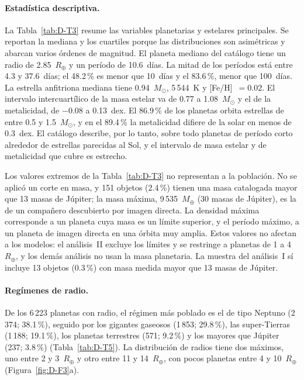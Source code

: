 \paragraph{Estadística descriptiva.}
La Tabla~\ref{tab:D-T3} resume las variables planetarias y estelares principales. Se
reportan la mediana y los cuartiles porque las distribuciones son asimétricas y abarcan
varios órdenes de magnitud. El planeta mediano del catálogo tiene un radio de
2.85~$R_\oplus$ y un período de 10.6~días. La mitad de los períodos está entre 4.3 y
37.6~días; el 48.2\,\% es menor que 10~días y el 83.6\,\%, menor que 100~días. La estrella
anfitriona mediana tiene 0.94~$M_\odot$, 5\,544~K y [Fe/H]~$= 0.02$. El intervalo
intercuartílico de la masa estelar va de 0.77 a 1.08~$M_\odot$ y el de la metalicidad, de
$-0.08$ a 0.13~dex. El 86.9\,\% de los planetas orbita estrellas de entre 0.5 y
1.5~$M_\odot$, y en el 89.4\,\% la metalicidad difiere de la solar en menos de 0.3~dex. El
catálogo describe, por lo tanto, sobre todo planetas de período corto alrededor de
estrellas parecidas al Sol, y el intervalo de masa estelar y de metalicidad que cubre es
estrecho.



Los valores extremos de la Tabla~\ref{tab:D-T3} no representan a la población. No se aplicó
un corte en masa, y 151 objetos (2.4\,\%) tienen una masa catalogada mayor que 13 masas de
Júpiter; la masa máxima, 9\,535~$M_\oplus$ (30 masas de Júpiter), es la de un compañero
descubierto por imagen directa. La densidad máxima corresponde a un planeta cuya masa es un
límite superior, y el período máximo, a un planeta de imagen directa en una órbita muy
amplia. Estos valores no afectan a los modelos: el análisis~II excluye los límites y se
restringe a planetas de 1 a 4~$R_\oplus$, y los demás análisis no usan la masa planetaria.
La muestra del análisis~I sí incluye 13 objetos (0.3\,\%) con masa medida mayor que 13
masas de Júpiter.

\paragraph{Regímenes de radio.}
De los 6\,223 planetas con radio, el régimen más poblado es el de tipo Neptuno (2\,374;
38.1\,\%), seguido por los gigantes gaseosos (1\,853; 29.8\,\%), las super-Tierras (1\,188;
19.1\,\%), los planetas terrestres (571; 9.2\,\%) y los mayores que Júpiter (237; 3.8\,\%)
(Tabla~\ref{tab:D-T5}). La distribución de radios tiene dos máximos, uno entre 2 y
3~$R_\oplus$ y otro entre 11 y 14~$R_\oplus$, con pocos planetas entre 4 y 10~$R_\oplus$
(Figura~\ref{fig:D-F3}a).

